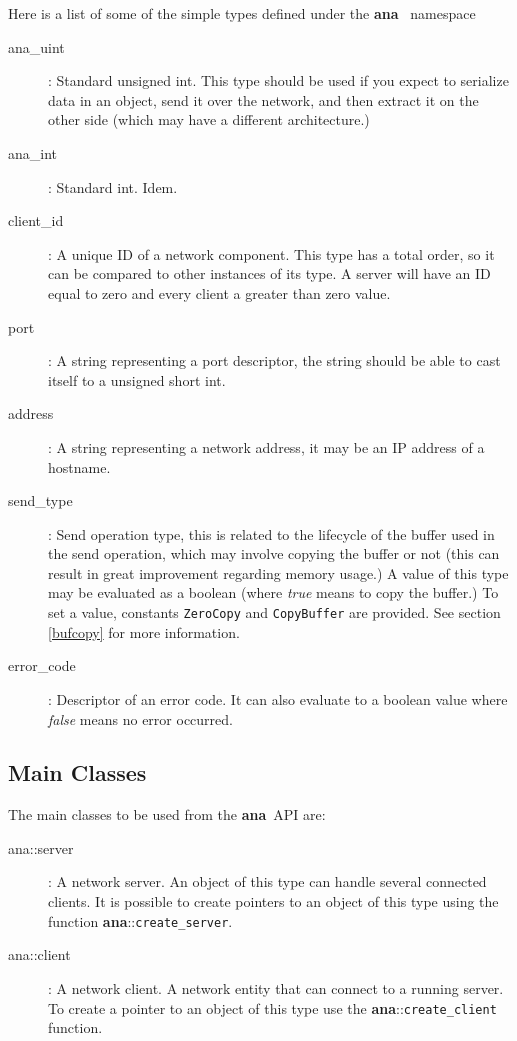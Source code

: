 \documentclass[a4paper,12pt,english]{article}
\newcommand{\ana}{\textbf{ana}}
\begin{document}
Here is  a list  of some of  the simple  types defined under  the \ana
\ namespace

\begin{description}
   \item [ana\_uint] : Standard unsigned int. This type should be used
     if you  expect to serialize data  in an object, send  it over the
     network, and then extract it on  the other side (which may have a
     different architecture.)
   \item [ana\_int] :  Standard int. Idem.
   \item [client\_id] : A unique  ID of a network component. This type
     has a  total order, so it  can be compared to  other instances of
     its type. A server will have an ID equal to zero and every client
     a greater than zero value.
   \item [port] : A string representing a port  descriptor, the string
     should be able to cast itself to a unsigned short int.
   \item [address] : A string  representing a network  address, it may 
     be an IP address of a hostname.
   \item [send\_type]  : Send operation  type, this is related  to the
     lifecycle of  the buffer  used in the  send operation,  which may
     involve  copying the  buffer or  not  (this can  result in  great
     improvement regarding memory usage.)  A value of this type may be
     evaluated  as a  boolean  (where \emph{true}  means  to copy  the
     buffer.)   To  set   a  value,  constants  \texttt{ZeroCopy}  and
     \texttt{CopyBuffer} are provided.   See section \ref{bufcopy} for
     more information.
   \item  [error\_code] :  Descriptor of  an error  code. It  can also
     evaluate  to a boolean  value where  \emph{false} means  no error
     occurred.
\end{description}

\subsection{Main Classes}

The main classes to be used from the \ana \ API are:
\begin{description}

\item[ana::server] :  A network  server.  An object  of this  type can
  handle several connected clients.  It is possible to create pointers
  to    an    object    of    this    type    using    the    function
  \ana::\texttt{create\_server}.

\item[ana::client]  : A  network  client. A  network  entity that  can
  connect to  a running server.  To create a  pointer to an  object of
  this type use the \ana::\texttt{create\_client} function.

\end{description}
\end{document}
